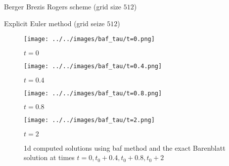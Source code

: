 \documentclass{jsarticle}
\theoremstyle{definition}
\begin{document}
%     

%     


\begin{table}[hbtp]
    \caption{Berger Brezis Rogers scheme (grid size $512$)}
    \label{table:bbr_test}
    \centering
    
\end{table}

\begin{table}[hbtp]
    \caption{Explicit Euler method (grid seize $512$)}
    \label{table:baf_test}
    \centering
    
\end{table}

  \begin{figure}
    \centering
    \begin{minipage}{0.4\hsize}
        \texttt{[image: ../../images/baf\_tau/t=0.png]}
        \caption{$t = 0$}
    \end{minipage}
    \begin{minipage}{0.4\hsize}
        \texttt{[image: ../../images/baf\_tau/t=0.4.png]}
        \caption{$t = 0.4$}
    \end{minipage}
    \begin{minipage}{0.4\hsize}
        \texttt{[image: ../../images/baf\_tau/t=0.8.png]}
        \caption{$t = 0.8$}
    \end{minipage}
    \begin{minipage}{0.4\hsize}
        \texttt{[image: ../../images/baf\_tau/t=2.png]}
        \caption{$t = 2$}
    \end{minipage}
    \caption{1d computed solutions using baf method and the exact Barenblatt solution at times $t  = 0, t_0 + 0.4, t_0 + 0.8, t_0 + 2$}
\end{figure}
\end{document}
